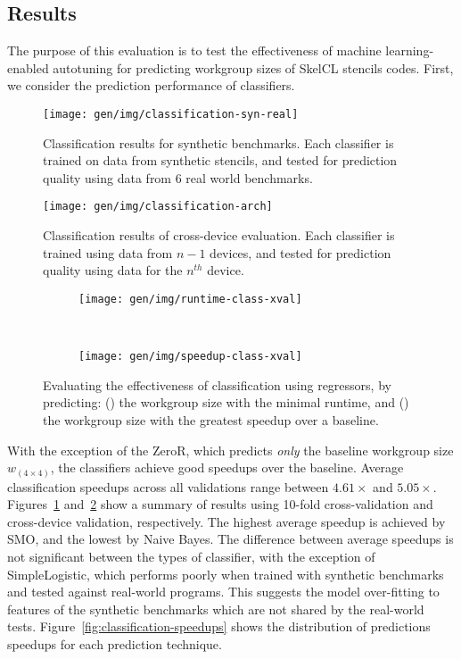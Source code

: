 \subsection{Results}

The purpose of this evaluation is to test the effectiveness of machine
learning-enabled autotuning for predicting workgroup sizes of SkelCL
stencils codes. First, we consider the prediction performance of
classifiers.


\begin{figure}
\centering
\texttt{[image: gen/img/classification-syn-real]}
\caption[Classification results using synthetic benchmarks]{%
  Classification results for synthetic benchmarks. Each classifier is
  trained on data from synthetic stencils, and tested for prediction
  quality using data from 6 real world benchmarks.%
}
\label{fig:class-syn}
\end{figure}
\newpage
\begin{figure}
\centering
\texttt{[image: gen/img/classification-arch]}
\caption[Classification results using cross-device evaluation]{%
  Classification results of cross-device evaluation. Each classifier
  is trained using data from $n-1$ devices, and tested for prediction
  quality using data for the $n^{th}$ device.%
}
\label{fig:class-arch}
\end{figure}
\begin{figure}
\centering
\begin{subfigure}[h]{.45\textwidth}
\centering
\texttt{[image: gen/img/runtime-class-xval]}
\caption{}
\label{fig:runtime-class-xval}
\end{subfigure}
~%
\begin{subfigure}[h]{.45\textwidth}
\centering
\texttt{[image: gen/img/speedup-class-xval]}
\caption{}
\label{fig:speedup-class-xval}
\end{subfigure}
\caption[Autotuning performance using regressors]{%
  Evaluating the effectiveness of classification using regressors, by
  predicting: () the workgroup size
  with the minimal runtime, and () the
  workgroup size with the greatest speedup over a baseline.%
}
\label{fig:regression-class}
\end{figure}

With the exception of the ZeroR, which predicts \emph{only} the
baseline workgroup size $w_{\left( 4 \times 4 \right)}$, the
classifiers achieve good speedups over the baseline. Average
classification speedups across all validations range between
$4.61\times$ and $5.05\times$. Figures~\ref{fig:class-syn}
and~\ref{fig:class-arch} show a summary of results using 10-fold
cross-validation and cross-device validation, respectively.  The
highest average speedup is achieved by SMO, and the lowest by Naive
Bayes. The difference between average speedups is not significant
between the types of classifier, with the exception of SimpleLogistic,
which performs poorly when trained with synthetic benchmarks and
tested against real-world programs. This suggests the model
over-fitting to features of the synthetic benchmarks which are not
shared by the real-world
tests. Figure~\ref{fig:classification-speedups} shows the distribution
of predictions speedups for each prediction technique.

